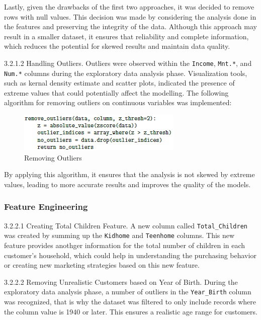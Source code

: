     Lastly, given the drawbacks of the first two approaches, it was decided to remove rows with null values. This decision was made by considering the analysis done in the features and preserving the integrity of the data. Although this approach may result in a smaller dataset, it ensures that reliability and complete information, which reduces the potential for skewed results and maintain data quality.

    3.2.1.2 Handling Outliers. Outliers were observed within the \texttt{Income}, \texttt{Mnt.*}, and \texttt{Num.*} columns during the exploratory data analysis phase. Visualization tools, such as kernal density estimate and scatter plots, indicated the presence of extreme values that could potentially affect the modelling. The following algorithm for removing outliers on continuous variables was implemented:

\begin{figure}[H]
    \centering
    \includegraphics[width=\linewidth]{figures/removing_outliers.png}
    \caption{Removing Outliers}
    \label{fig:income hist}
\end{figure}

    By applying this algorithm, it ensures that the analysis is not skewed by extreme values, leading to more accurate results and improves the quality of the models.

\subsubsection{Feature Engineering}

    3.2.2.1 Creating Total Children Feature. A new column called \texttt{Total\_Children} was created by summing up the \texttt{Kidhome} and \texttt{Teenhome} columns. This new feature provides anothger information for the total number of children in each customer's household, which could help in understanding the purchasing behavior or creating new marketing strategies based on this new feature.

    3.2.2.2 Removing Unrealistic Customers based on Year of Birth. During the exploratory data analysis phase, a number of outliers in the \texttt{Year\_Birth} column was recognized, that is why the dataset was filtered to only include records where the column value is 1940 or later. This ensures a realistic age range for customers.

